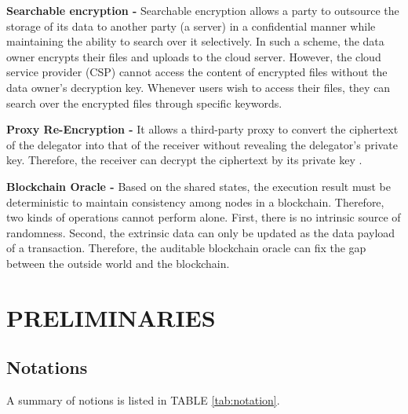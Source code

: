 \documentclass[journal]{IEEEtran}
\begin{document}
    \textbf{Searchable encryption -} Searchable encryption allows a party to outsource the storage of its data to another party (a server) in a confidential manner while maintaining the ability to search over it selectively. In such a scheme, the data owner encrypts their files and uploads to the cloud server. However, the cloud service provider (CSP) cannot access the content of encrypted files without the data owner's decryption key. Whenever users wish to access their files, they can search over the encrypted files through specific keywords.

    \textbf{Proxy Re-Encryption -} It allows a third-party proxy to convert the ciphertext of the delegator into that of the receiver without revealing the delegator's private key. Therefore, the receiver can decrypt the ciphertext by its private key \cite{pre2010}. 


    \textbf{Blockchain Oracle -} Based on the shared states, the execution result must be deterministic to maintain consistency among nodes in a blockchain. Therefore, two kinds of operations cannot perform alone. First, there is no intrinsic source of randomness. Second, the extrinsic data can only be updated as the data payload of a transaction. Therefore, the auditable blockchain oracle can fix the gap between the outside world and the blockchain.
      
    \section{PRELIMINARIES}
    
    \subsection{Notations}
    A summary of notions is listed in TABLE \ref{tab:notation}.
\end{document}
